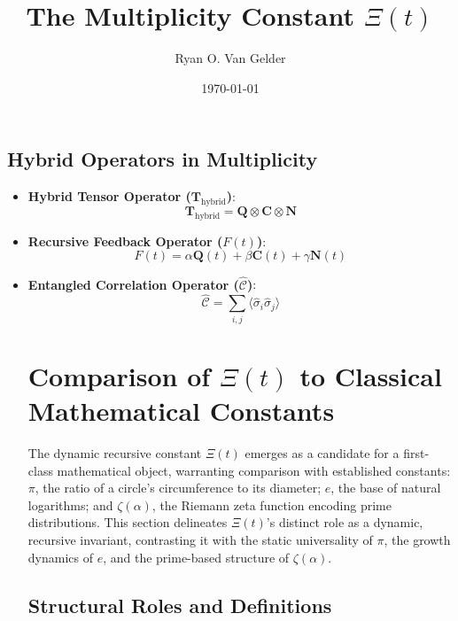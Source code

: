 \documentclass{article}
\theoremstyle{plain}
\begin{document}
\subsection{Hybrid Operators in Multiplicity}
\begin{itemize}
    \item \textbf{Hybrid Tensor Operator (\(\mathbf{T}_{\text{hybrid}}\))}:
    \[
    \mathbf{T}_{\text{hybrid}} = \mathbf{Q} \otimes \mathbf{C} \otimes \mathbf{N}
    \]

    \item \textbf{Recursive Feedback Operator (\(F(t)\))}:
    \[
    F(t) = \alpha \mathbf{Q}(t) + \beta \mathbf{C}(t) + \gamma \mathbf{N}(t)
    \]

    \item \textbf{Entangled Correlation Operator (\(\hat{\mathcal{C}}\))}:
    \[
    \hat{\mathcal{C}} = \sum_{i,j} \langle \hat{\sigma}_i \hat{\sigma}_j \rangle
    \]

\title{The Multiplicity Constant \(\Xi(t) \) }

\author{Ryan O. Van Gelder}
\date{\today}

\maketitle
\nolinenumbers

\section{Comparison of \(\Xi(t) \) to Classical Mathematical Constants}

The dynamic recursive constant \(\Xi(t) \) emerges as a candidate for a first-class mathematical object, warranting comparison with established constants: \(\pi\), the ratio of a circle's circumference to its diameter; \(e\), the base of natural logarithms; and \(\zeta(\alpha)\), the Riemann zeta function encoding prime distributions. This section delineates \(\Xi(t) \)'s distinct role as a dynamic, recursive invariant, contrasting it with the static universality of \( \pi \), the growth dynamics of \( e \), and the prime-based structure of \( \zeta(\alpha) \).

\subsection{Structural Roles and Definitions}


\end{itemize}
\end{document}
